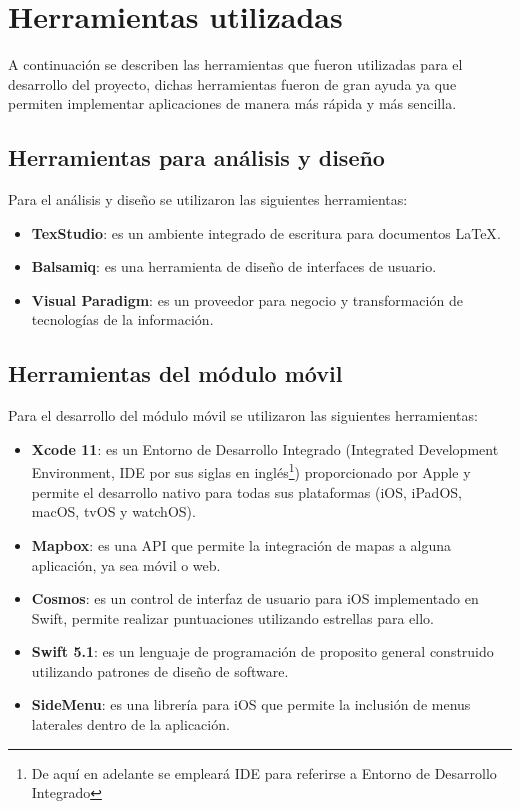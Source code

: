 \section{Herramientas utilizadas}
A continuación se describen las herramientas que fueron utilizadas para el desarrollo del proyecto, dichas herramientas fueron de gran ayuda ya que permiten implementar aplicaciones de manera más rápida y más sencilla. 

\subsection{Herramientas para análisis y diseño}

Para el análisis y diseño se utilizaron las siguientes herramientas:

\begin{itemize}
	\item \textbf{TexStudio}: es un ambiente integrado de escritura para documentos LaTeX\cite{tex}.
	
	\item \textbf{Balsamiq}: es una herramienta de diseño de interfaces de usuario\cite{balsamiq}.
	
	\item \textbf{Visual Paradigm}: es un proveedor para negocio y transformación de tecnologías de la información\cite{visual}.
\end{itemize}

\subsection{Herramientas del módulo móvil}

Para el desarrollo del módulo móvil se utilizaron las siguientes herramientas:

\begin{itemize}
	
	\item \textbf{Xcode 11}: es un Entorno de Desarrollo Integrado (Integrated Development Environment, IDE por sus siglas en inglés\footnote{De aquí en adelante se empleará IDE para referirse a Entorno de Desarrollo Integrado}) proporcionado por Apple y permite el desarrollo nativo para todas sus plataformas (iOS, iPadOS, macOS, tvOS y watchOS)\cite{xcode}.
	
	\item \textbf{Mapbox}: es una API que permite la integración de mapas a alguna aplicación, ya sea móvil o web\cite{mapbox}.
	
	\item \textbf{Cosmos}: es un control de interfaz de usuario para iOS implementado en Swift, permite realizar puntuaciones utilizando estrellas para ello\cite{Cosmos}.
	
	\item \textbf{Swift 5.1}: es un lenguaje de programación de proposito general construido utilizando patrones de diseño de software\cite{swift}.
	
	\item \textbf{SideMenu}: es una librería para iOS que permite la inclusión de menus laterales dentro de la aplicación\cite{sidemenu}.
	
\end{itemize}


